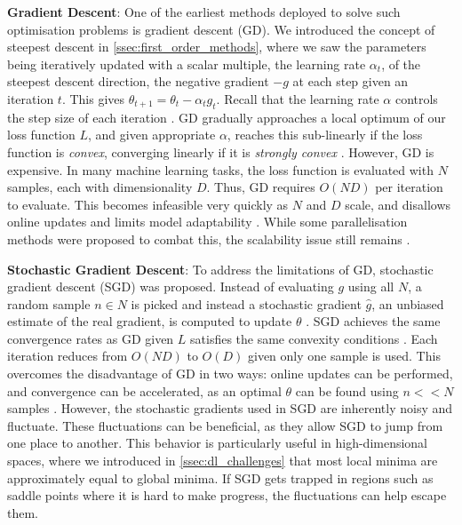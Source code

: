 \textbf{Gradient Descent}: One of the earliest methods deployed to solve such optimisation problems is gradient descent (GD). We introduced the concept of steepest descent in \cref{ssec:first_order_methods}, where we saw the parameters being iteratively updated with a scalar multiple, the learning rate $\alpha_{t}$, of the steepest descent direction, the negative gradient $-g$ at each step given an iteration $t$. This gives $\theta_{t+1} = \theta_{t} - \alpha_{t} g_{t}$. Recall that the learning rate $\alpha$ controls the step size of each iteration \citep{ruder2016overview}. GD gradually approaches a local optimum of our loss function $L$, and given appropriate $\alpha$, reaches this sub-linearly if the loss function is \textit{convex}, converging linearly if it is \textit{strongly convex} \citep{NoceWrig06}. However, GD is expensive. In many machine learning tasks, the loss function is evaluated with $N$ samples, each with dimensionality $D$. Thus, GD requires $O(ND)$ per iteration to evaluate. This becomes infeasible very quickly as $N$ and $D$ scale, and disallows online updates and limits model adaptability \citep{ruder2016overview}. While some parallelisation methods were proposed to combat this, the scalability issue still remains \citep{alspector1992parallel,NoceWrig06}. 

\textbf{Stochastic Gradient Descent}: To address the limitations of GD, stochastic gradient descent (SGD) was proposed. Instead of evaluating $g$ using all $N$, a random sample $n \in N$ is picked and instead a stochastic gradient $\hat{g}$, an unbiased estimate of the real gradient, is computed to update $\theta$ \citep{robbins1951stochastic}. SGD achieves the same convergence rates as GD given $L$ satisfies the same convexity conditions \citep{johnson2013accelerating, nemirovski2009robust}. Each iteration reduces from $O(ND)$ to $O(D)$ given only one sample is used.
This overcomes the disadvantage of GD in two ways: online updates can be performed, and convergence can be accelerated, as an optimal $\theta$ can be found using $n << N$ samples \citep{johnson2013accelerating, nemirovski2009robust}. However, the stochastic gradients used in SGD are inherently noisy and fluctuate. These fluctuations can be beneficial, as they allow SGD to jump from one place to another. This behavior is particularly useful in high-dimensional spaces, where we introduced in \cref{ssec:dl_challenges} that most local minima are approximately equal to global minima. If SGD gets trapped in regions such as saddle points where it is hard to make progress, the fluctuations can help escape them.


